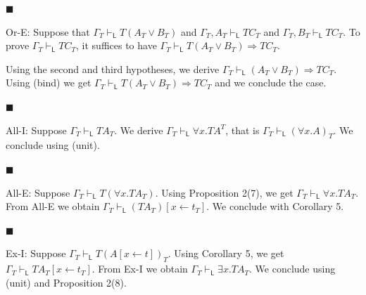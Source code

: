 \par\noindent  $\blacksquare$ 
 
Or-E: Suppose that $\Gamma_{T}\vdash_{\mathsf{L}}T(A_{T}\mathbin{\vee}B_{T})$ and $\Gamma_{T},A_{T}\vdash_{\mathsf{L}}TC_{T}$ and $\Gamma_{T},B_{T}\vdash_{\mathsf{L}}TC_{T}$. To prove $\Gamma_{T}\vdash_{\mathsf{L}}TC_{T}$, it suffices to have $\Gamma_{T}\vdash_{\mathsf{L}}T(A_{T}\mathbin{\vee}B_{T})\mathbin{\Rightarrow}TC_{T}$.\par
 
 
 
Using the second and third hypotheses, we derive $\Gamma_{T}\vdash_{\mathsf{L}}(A_{T}\mathbin{\vee}B_{T})\mathbin{\Rightarrow}TC_{T}$. Using (bind) we get $\Gamma_{T}\vdash_{\mathsf{L}}T(A_{T}\mathbin{\vee}B_{T})\mathbin{\Rightarrow}TC_{T}$ and we conclude the case.\par
 
 
 
\par\noindent  $\blacksquare$ 
 
All-I: Suppose $\Gamma_{T}\vdash_{\mathsf{L}}TA_{T}$. We derive $\Gamma_{T}\vdash_{\mathsf{L}}{\forall}x.TA^{T}$, that is $\Gamma_{T}\vdash_{\mathsf{L}}({\forall}x.A)_{T}$. We conclude using (unit).\par
 
 
 
\par\noindent  $\blacksquare$ 
 
All-E: Suppose $\Gamma_{T}\vdash_{\mathsf{L}}T({\forall}x.TA_{T})$. Using Proposition 2(7), we get $\Gamma_{T}\vdash_{\mathsf{L}}{\forall}x.TA_{T}$. From All-E we obtain $\Gamma_{T}\vdash_{\mathsf{L}}(TA_{T})[x\leftarrow t_{T}]$. We conclude with Corollary 5.\par
 
 
 
\par\noindent  $\blacksquare$ 
 
Ex-I: Suppose $\Gamma_{T}\vdash_{\mathsf{L}}T(A[x\leftarrow t])_{T}$. Using Corollary 5, we get $\Gamma_{T}\vdash_{\mathsf{L}}TA_{T}[x\leftarrow t_{T}]$. From Ex-I we obtain $\Gamma_{T}\vdash_{\mathsf{L}}{\exists}x.TA_{T}$. We conclude using (unit) and Proposition 2(8).\par
 
 
